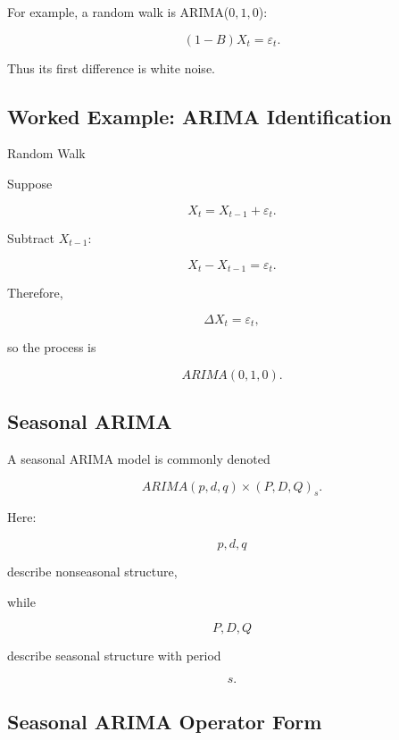 For example, a random walk is ARIMA(\(0,1,0\)):

\[
\boxed{
(1-B)X_t
=
\varepsilon_t.
}
\]

Thus its first difference is white noise.

\subsection{Worked Example: ARIMA Identification}
\label{subsec:worked-arima-identification}

\begin{workedexamplebox}{Random Walk}

Suppose

\[
X_t
=
X_{t-1}
+
\varepsilon_t.
\]

Subtract \(X_{t-1}\):

\[
X_t-X_{t-1}
=
\varepsilon_t.
\]

Therefore,

\begin{answerbox}
\[
\boxed{
\Delta X_t
=
\varepsilon_t,
}
\]

so the process is

\[
\boxed{
ARIMA(0,1,0).
}
\]
\end{answerbox}

\end{workedexamplebox}

\subsection{Seasonal ARIMA}
\label{subsec:seasonal-arima}

A seasonal ARIMA model is commonly denoted

\[
\boxed{
ARIMA
(
p,d,q
)
\times
(
P,D,Q
)_s.
}
\]

Here:

\[
p,d,q
\]

describe nonseasonal structure,

while

\[
P,D,Q
\]

describe seasonal structure with period

\[
s.
\]

\subsection{Seasonal ARIMA Operator Form}
\label{subsec:seasonal-arima-operator}

